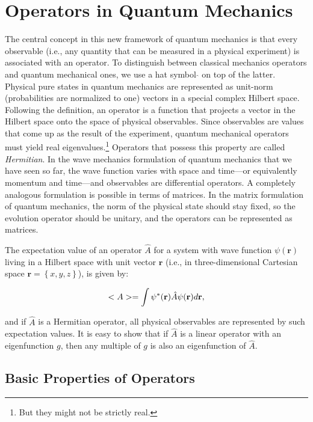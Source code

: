 \documentclass[
  9pt,
]{extbook}
\theoremstyle{definition}
\theoremstyle{definition}
\theoremstyle{definition}
\theoremstyle{remark}
\begin{document}
\hypertarget{operators-in-quantum-mechanics}{%
\section{Operators in Quantum Mechanics}\label{operators-in-quantum-mechanics}}

The central concept in this new framework of quantum mechanics is that every observable (i.e., any quantity that can be measured in a physical experiment) is associated with an operator. To distinguish between classical mechanics operators and quantum mechanical ones, we use a hat symbol \(\hat{}\) on top of the latter. Physical pure states in quantum mechanics are represented as unit-norm (probabilities are normalized to one) vectors in a special complex Hilbert space. Following the definition, an operator is a function that projects a vector in the Hilbert space onto the space of physical observables. Since observables are values that come up as the result of the experiment, quantum mechanical operators must yield real eigenvalues.\footnote{But they might not be strictly real.} Operators that possess this property are called \emph{Hermitian}.
In the wave mechanics formulation of quantum mechanics that we have seen so far, the wave function varies with space and time---or equivalently momentum and time---and observables are differential operators. A completely analogous formulation is possible in terms of matrices. In the matrix formulation of quantum mechanics, the norm of the physical state should stay fixed, so the evolution operator should be unitary, and the operators can be represented as matrices.

The expectation value of an operator \(\hat{A}\) for a system with wave function \(\psi(\mathbf{r})\) living in a Hilbert space with unit vector \(\mathbf{r}\) (i.e., in three-dimensional Cartesian space \(\mathbf{r} = \left\{ x,y,z \right\}\)), is given by:

\begin{equation}
<A> = \int \psi^{*}({\bf r}) \hat{A} \psi({\bf r}) d{\bf r},
\label{eq:ee1b}
\end{equation}

and if \(\hat{A}\) is a Hermitian operator, all physical observables are represented by such expectation values. It is easy to show that if \(\hat{A}\) is a linear operator with an eigenfunction \(g\), then any multiple of \(g\) is also an eigenfunction of \(\hat{A}\).

\hypertarget{basic-properties-of-operators}{%
\subsection{Basic Properties of Operators}\label{basic-properties-of-operators}}
\end{document}
